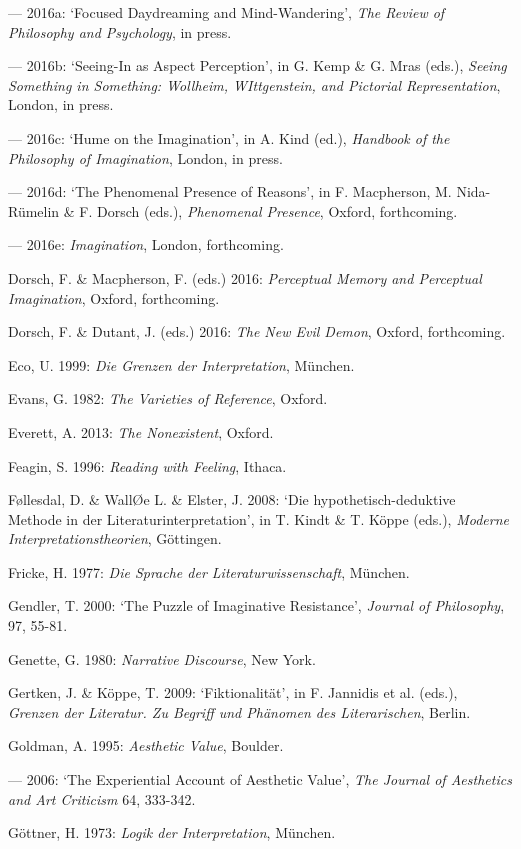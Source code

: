 \begin{hangparas}{.5cm}{1}
--- 2016a: `Focused Daydreaming and Mind-Wandering', \emph{The Review of Philosophy and Psychology}, in press.
 
--- 2016b: `Seeing-In as Aspect Perception', in G. Kemp \& G. Mras (eds.), \emph{Seeing Something in Something: Wollheim, WIttgenstein, and Pictorial Representation}, London, in press.

--- 2016c: `Hume on the Imagination', in A. Kind (ed.), \emph{Handbook of the Philosophy of Imagination}, London, in press.
 
--- 2016d: `The Phenomenal Presence of Reasons', in F. Macpherson, M. Nida-R\"umelin \& F. Dorsch (eds.), \emph{Phenomenal Presence}, Oxford, forthcoming. 
 
--- 2016e: \emph{Imagination}, London, forthcoming.

Dorsch, F. \& Macpherson, F. (eds.) 2016: \emph{Perceptual Memory and Perceptual Imagination}, Oxford, forthcoming. 

Dorsch, F. \& Dutant, J. (eds.) 2016: \emph{The New Evil Demon}, Oxford, forthcoming.

Eco, U. 1999: \emph{Die Grenzen der Interpretation}, M\"unchen. 

Evans, G. 1982: \emph{The Varieties of Reference}, Oxford. 

Everett, A. 2013: \emph{The Nonexistent}, Oxford. 

Feagin, S. 1996: \emph{Reading with Feeling}, Ithaca.

F\o{}llesdal, D. \& Wall\O{}e L. \& Elster, J. 2008: `Die hypothetisch-deduktive Methode in der Literaturinterpretation', in T. Kindt \& T. K\"oppe (eds.), \emph{Moderne Interpretationstheorien}, G\"ottingen.

Fricke, H. 1977: \emph{Die Sprache der Literaturwissenschaft}, M\"unchen.

Gendler, T. 2000: `The Puzzle of Imaginative Resistance', \emph{Journal of Philosophy}, 97, 55-81.

Genette, G. 1980: \emph{Narrative Discourse}, New York. 

Gertken, J. \& K\"oppe, T. 2009: `Fiktionalit\"at', in F. Jannidis et al. (eds.), \emph{Grenzen der Literatur. Zu Begriff und Ph\"anomen des Literarischen}, Berlin. 

Goldman, A. 1995: \emph{Aesthetic Value}, Boulder. 

--- 2006: `The Experiential Account of Aesthetic Value', \emph{The Journal of Aesthetics and Art Criticism} 64, 333-342.

G\"ottner, H. 1973: \emph{Logik der Interpretation}, M\"unchen.


\end{hangparas}
